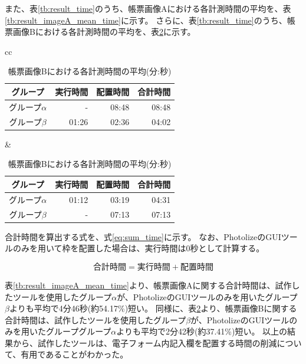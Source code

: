 また、表\ref{tb:result_time}のうち、帳票画像Aにおける各計測時間の平均を、表\ref{tb:result_imageA_mean_time}に示す。
さらに、表\ref{tb:result_time}のうち、帳票画像Bにおける各計測時間の平均を、表\ref{tb:result_imageB_mean_time}に示す。
\begin{table}[tp]
	\centering
    \begin{tabular}{cc}
        \begin{minipage}[c]{0.5\hsize}
            \centering
            \caption{帳票画像Aにおける各計測時間の平均(分:秒)}
            \label{tb:result_imageA_mean_time}
            \begin{tabular}{c|rrr}
                グループ & 実行時間 & 配置時間 & 合計時間 \\
                \hline \hline
                グループ$\alpha$ & - & 08:48 & 08:48 \\
                グループ$\beta$ & 01:26 & 02:36 & 04:02 \\
	        \end{tabular}
        \end{minipage} &
        \begin{minipage}[c]{0.5\hsize}
            \centering
            \caption{帳票画像Bにおける各計測時間の平均(分:秒)}
            \label{tb:result_imageB_mean_time}
            \begin{tabular}{c|rrr}
                グループ & 実行時間 & 配置時間 & 合計時間 \\
                \hline \hline
                グループ$\alpha$ & 01:12 & 03:19 & 04:31 \\
                グループ$\beta$ & - & 07:13 & 07:13 \\
            \end{tabular}
        \end{minipage}
    \end{tabular}
\end{table}
合計時間を算出する式を、式\ref{eq:sum_time}に示す。
なお、PhotolizeのGUIツールのみを用いて枠を配置した場合は、実行時間は0秒として計算する。

\begin{equation}\label{eq:sum_time}
    合計時間=実行時間+配置時間
\end{equation}

表\ref{tb:result_imageA_mean_time}より、帳票画像Aに関する合計時間は、試作したツールを使用したグループ$\alpha$が、PhotolizeのGUIツールのみを用いたグループ$\beta$よりも平均で4分46秒(約54.17\%)短い。
同様に、表\ref{tb:result_imageB_mean_time}より、帳票画像Bに関する合計時間は、試作したツールを使用したグループ$\beta$が、PhotolizeのGUIツールのみを用いたグループグループ$\alpha$よりも平均で2分42秒(約37.41\%)短い。
以上の結果から、試作したツールは、電子フォーム内記入欄を配置する時間の削減について、有用であることがわかった。

